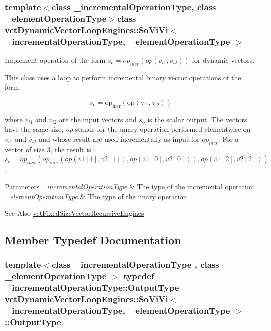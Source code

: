 \subsubsection*{template$<$class \-\_\-incremental\-Operation\-Type, class \-\_\-element\-Operation\-Type$>$class vct\-Dynamic\-Vector\-Loop\-Engines\-::\-So\-Vi\-Vi$<$ \-\_\-incremental\-Operation\-Type, \-\_\-element\-Operation\-Type $>$}

Implement operation of the form $s_o = op_{incr}(op(v_{i1}, v_{i2}))$ for dynamic vectors. 

This class uses a loop to perform incremental binary vector operations of the form

\[ s_o = \mathrm{op_{incr}(\mathrm{op}(v_{i1}, v_{i2}))} \]

where $v_{i1}$ and $v_{i2}$ are the input vectors and $s_o$ is the scalar output. The vectors have the same size, {\itshape op} stands for the unary operation performed elementwise on $v_{i1}$ and $v_{i2}$ and whose result are used incrementally as input for $op_{incr}$. For a vector of size 3, the result is $s_o = op_{incr}(op_{incr}(op(v1[1], v2[1]), op(v1[0], v2[0])), op(v1[2], v2[2]))$.


\begin{DoxyParams}{Parameters}
{\em \-\_\-incremental\-Operation\-Type} & The type of the incremental operation.\\
\hline
{\em \-\_\-element\-Operation\-Type} & The type of the unary operation.\\
\hline
\end{DoxyParams}
\begin{DoxySeeAlso}{See Also}
\hyperlink{classvct_fixed_size_vector_recursive_engines}{vct\-Fixed\-Size\-Vector\-Recursive\-Engines} 
\end{DoxySeeAlso}


\subsection{Member Typedef Documentation}
\hypertarget{classvct_dynamic_vector_loop_engines_1_1_so_vi_vi_af495d5a3b96441aefe55b21a9988d335}{
\subsubsection[{Output\-Type}]{\setlength{\rightskip}{0pt plus 5cm}template$<$class \-\_\-incremental\-Operation\-Type , class \-\_\-element\-Operation\-Type $>$ typedef \-\_\-incremental\-Operation\-Type\-::\-Output\-Type {\bf vct\-Dynamic\-Vector\-Loop\-Engines\-::\-So\-Vi\-Vi}$<$ \-\_\-incremental\-Operation\-Type, \-\_\-element\-Operation\-Type $>$\-::{\bf Output\-Type}}}\label{classvct_dynamic_vector_loop_engines_1_1_so_vi_vi_af495d5a3b96441aefe55b21a9988d335}



